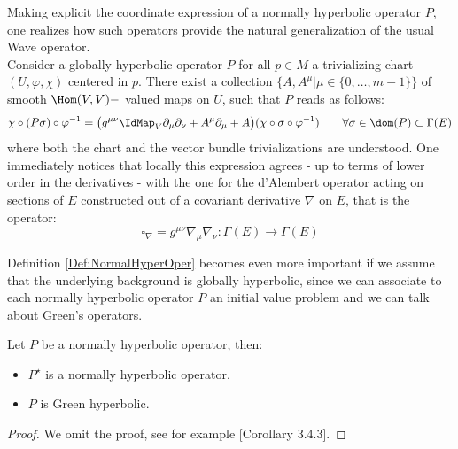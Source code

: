 \documentclass[Main]{subfiles}
\begin{document}
			Making explicit the coordinate expression of a normally hyperbolic operator $P$, one realizes how such operators  provide the natural generalization of the usual Wave operator.
			\\
			Consider a globally hyperbolic operator $P$ for all $p \in M$ a trivializing chart $(U, \varphi, \chi)$ centered in $p$.
			There exist a collection $\big\{A, A^\mu \vert \mu\in \{0, \ldots ,m-1\}\big\}$ of smooth
			$\Hom(V,V)-$ valued maps on $U$, such that $P$ reads as follows:
			\begin{equation}\label{Eq:NormallyHyperbolicRepresentation}
				\chi \circ ( P \sigma) \circ \varphi^{-1} =
				\big( g^{\mu \nu} \IdMap_V \partial_\mu \partial_\nu + A^\mu \partial_\mu + A\big)
				(\chi \circ \sigma \circ \varphi^{-1} )
				\qquad \forall \sigma \in \dom(P) \subset \Gamma(E)
			\end{equation}
		where both the chart and the vector bundle trivializations are understood.
		One immediately notices that locally this expression agrees  - up to terms of lower order in the derivatives  - with the one for the d'Alembert operator acting on sections of $E$  constructed out of a covariant derivative $\nabla$ on $E$, that is the operator:
		\begin{displaymath}
			\square_\nabla = g^{\mu \nu} \nabla_\mu \nabla_\nu : \Gamma(E) \rightarrow \Gamma(E)
		\end{displaymath}

		Definition \ref{Def:NormalHyperOper} becomes even more important if we assume that the underlying background is globally hyperbolic, since we can associate to each normally hyperbolic operator $P$ an initial value problem and we can talk about Green's operators.
		\begin{proposition}
			Let $P$ be a normally hyperbolic operator, then:
			\begin{itemize}
				\item	$P^\star$ is a normally hyperbolic operator.
				\item $P$ is Green hyperbolic.
			\end{itemize}
		\end{proposition}
		\begin{proof}
			We omit the proof, see for example \cite{Baer2008}[Corollary 3.4.3].
		\end{proof}
\end{document}
